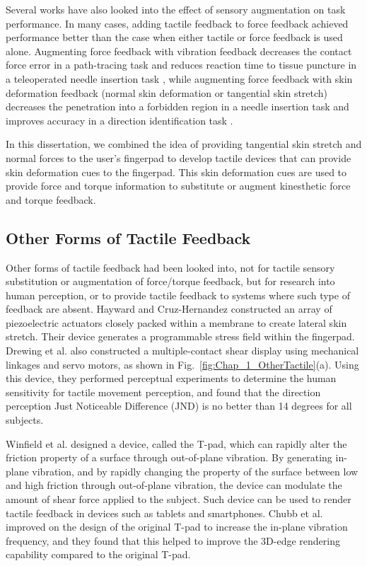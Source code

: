 Several works have also looked into the effect of sensory augmentation on task performance. In many cases, adding tactile feedback to force feedback achieved performance better than the case when either tactile or force feedback is used alone. Augmenting force feedback with vibration feedback decreases the contact force error in a path-tracing task \cite{Debus2001_2} and reduces reaction time to tissue puncture in a teleoperated needle insertion task \cite{Kontarinis1996}, while augmenting force feedback with skin deformation feedback (normal skin deformation or tangential skin stretch) decreases the penetration into a forbidden region in a needle insertion task \cite{Pacchierotti2014}\cite{Tirmizi2013} and improves accuracy in a direction identification task \cite{Gwilliam2013}.

In this dissertation, we combined the idea of providing tangential skin stretch and normal forces to the user's fingerpad to develop tactile devices that can provide skin deformation cues to the fingerpad. This skin deformation cues are used to provide force and torque information to substitute or augment kinesthetic force and torque feedback.

\subsection{Other Forms of Tactile Feedback}
Other forms of tactile feedback had been looked into, not for tactile sensory substitution or augmentation of force/torque feedback, but for research into human perception, or to provide tactile feedback to systems where such type of feedback are absent. Hayward and Cruz-Hernandez  \cite{Hayward2000} constructed an array of piezoelectric actuators closely packed within a membrane to create lateral skin stretch. Their device generates a programmable stress field within the fingerpad. Drewing et al. \cite{Drewing2005} also constructed a multiple-contact shear display using mechanical linkages and servo motors, as shown in Fig.~\ref{fig:Chap_1_OtherTactile}(a). Using this device, they performed perceptual experiments to determine the human sensitivity for tactile movement perception, and found that the direction perception Just Noticeable Difference (JND) is no better than 14 degrees for all subjects.

Winfield et al. \cite{Winfield2007} designed a device, called the T-pad, which can rapidly alter the friction property of a surface through out-of-plane vibration. By generating in-plane vibration, and by rapidly changing the property of the surface between low and high friction through out-of-plane vibration, the device can modulate the amount of shear force applied to the subject. Such device can be used to render tactile feedback in devices such as tablets and smartphones. Chubb et al. \cite{Chubb2010} improved on the design of the original T-pad to increase the in-plane vibration frequency, and they found that this helped to improve the 3D-edge rendering capability compared to the original T-pad. 

